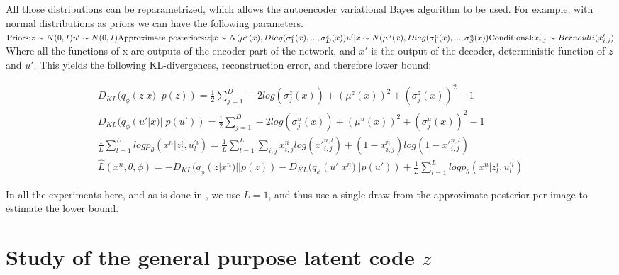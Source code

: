 \documentclass[letterpaper, twoside]{article}
\begin{document}
All those distributions can be reparametrized, which allows the autoencoder variational Bayes algorithm \cite{Kingma.aevb} to be used. 
For example, with normal distributions as priors we can have the following parameters.\\

$
\text{Priors:}\\
z \sim N(0, I)\\
u' \sim N(0, I)\\
\text{Approximate posteriors:}\\
 z | x \sim N(\mu^z(x), Diag(\sigma_1^z(x), ..., \sigma_D^z(x))\\
 u' | x \sim N(\mu^u(x), Diag(\sigma_1^u(x), ..., \sigma_S^u(x))\\
 \text{Conditional:}\\
 x_{i, j} \sim Bernoulli(x'_{i, j})
$\\
Where all the functions of x are outputs of the encoder part of the network, and $x'$ is the output of the decoder, deterministic function of $z$ and $u'$.
This yields the following KL-divergences, reconstruction error, and therefore lower bound:

\begin{align}
D_{KL}(q_\phi(z|x) || p(z)) = \frac{1}{2} \sum_{j=1}^D  -2 log (\sigma_j^z(x)) + (\mu^z(x))^2 + (\sigma_j^z(x))^2 - 1\\
D_{KL}(q_\phi(u'|x) || p(u')) = \frac{1}{2} \sum_{j=1}^D  -2 log (\sigma_j^u(x)) + (\mu^u(x))^2 + (\sigma_j^u(x))^2 - 1\\
\frac{1}{L} \sum_{l=1}^L log p_\theta(x^n | z_{l}^i, u_{l}^{'i}) = \frac{1}{L} \sum_{l=1}^L \sum_{i, j} x_{i,j}^n log({x'}_{i, j}^{n, l}) + (1 - x_{i,j}^n) log(1 - {x'}_{i, j}^{n, l})\\
\hat L(x^n, \theta, \phi) = -D_{KL}(q_\phi(z|x^n) || p(z)) - D_{KL}(q_\phi(u'|x^n) || p(u')) + \frac{1}{L} \sum_{l=1}^L log p_\theta(x^n | z_{l}^i, u_{l}^{'i})
\end{align}

In all the experiments here, and as is done in \cite{Kingma.aevb}, we use $L=1$, and thus use a single draw from the approximate posterior per image to estimate the lower bound.

\section{Study of the general purpose latent code $z$}
\end{document}
